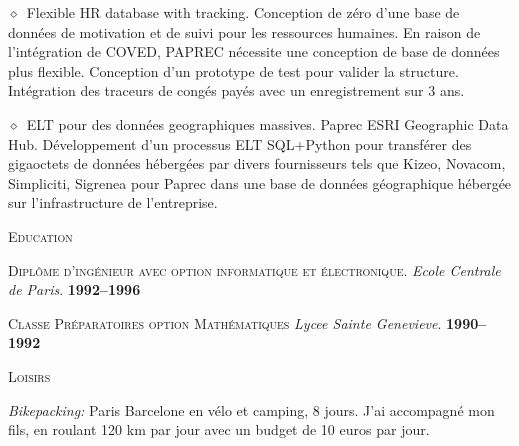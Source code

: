 \documentclass[11pt, a4paper]{article}
\newcommand{\dates}[1]{\hfill\mbox{\textbf{#1}}} %
\newcommand{\smaller}[1]{{\small$\diamond$\ #1}}
\newcommand{\headright}[1]{\vspace*{2.5ex}\textsc{\Large\color{cvblue}#1}\par%
     \vspace*{-2ex}{\color{cvblue}\hrulefill}\par}
\begin{document}
\begin{minipage}[t]{0.56\textwidth}
\smaller{Flexible HR database with tracking. Conception de zéro d'une base de données de motivation et de suivi pour les ressources humaines. En raison de l'intégration de COVED, PAPREC nécessite une conception de base de données plus flexible. Conception d'un prototype de test pour valider la structure. Intégration des traceurs de congés payés avec un enregistrement sur 3 ans.}

\smaller{ELT pour des données geographiques massives.
Paprec ESRI Geographic Data Hub. Développement d'un processus ELT SQL+Python pour transférer des gigaoctets de données hébergées par divers fournisseurs tels que Kizeo, Novacom, Simpliciti, Sigrenea pour Paprec dans une base de données géographique hébergée sur l'infrastructure de l'entreprise.} 


\headright{Education}

\textsc{Diplôme d'ingénieur avec option informatique et électronique.} \textit{Ecole Centrale de Paris}. \dates{1992--1996}

\textsc{Classe Préparatoires option Mathématiques} \textit{Lycee Sainte Genevieve}.  \dates{1990--1992}

\headright{Loisirs}

\textit{Bikepacking:} Paris Barcelone en vélo et camping, 8 jours.
J'ai accompagné mon fils, en roulant 120 km par jour avec un budget de 10 euros par jour.

\end{minipage}
\end{document}
